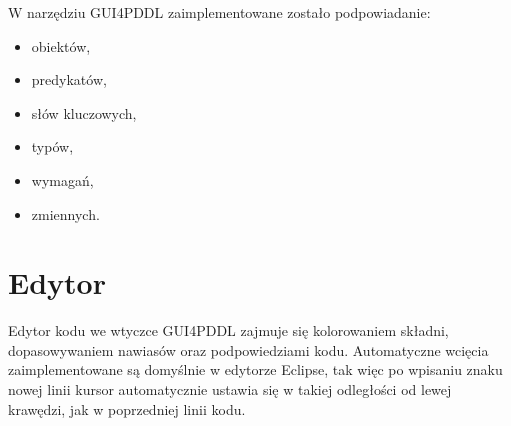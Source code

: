 W narzędziu GUI4PDDL zaimplementowane zostało podpowiadanie:
\begin{itemize}
\item obiektów,
\item predykatów,
\item słów kluczowych,
\item typów,
\item wymagań,
\item zmiennych.
\end{itemize}

\section{Edytor}
\label{sec:edytor}
Edytor kodu we wtyczce GUI4PDDL zajmuje się kolorowaniem składni, dopasowywaniem nawiasów oraz podpowiedziami kodu. Automatyczne wcięcia zaimplementowane są domyślnie w edytorze Eclipse, tak więc po wpisaniu znaku nowej linii kursor automatycznie ustawia się w takiej odległości od lewej krawędzi, jak w poprzedniej linii kodu.
